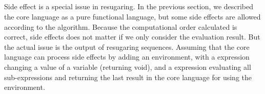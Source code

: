 \subsection{}


Side effect is a special issue in resugaring. In the previous section, we described the core language as a pure functional language, but some side effects are allowed according to the algorithm. Because the computational order calculated is correct, side effects does not matter if we only consider the evaluation result. But the actual issue is the output of resugaring sequences. Assuming that the core language can process side effects by adding an environment, with a  expression changing a value of a variable (returning void), and a  expression evaluating all sub-expressions and returning the last result in the core language for using the environment.

